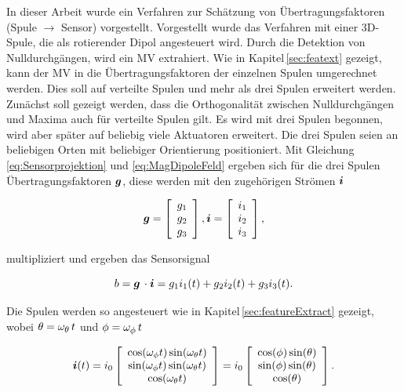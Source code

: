    In dieser Arbeit wurde ein Verfahren zur Schätzung von Übertragungsfaktoren (Spule $\rightarrow$ Sensor) vorgestellt. Vorgestellt wurde das Verfahren mit einer 3D-Spule, die als rotierender Dipol angesteuert wird. Durch die Detektion von Nulldurchgängen, wird ein MV extrahiert. Wie in Kapitel\,\ref{sec:featext} gezeigt, kann der MV in die Übertragungsfaktoren der einzelnen Spulen umgerechnet werden. Dies soll auf verteilte Spulen und mehr als drei Spulen erweitert werden.\\
   Zunächst soll gezeigt werden, dass die Orthogonalität zwischen Nulldurchgängen und Maxima auch für verteilte Spulen gilt. Es wird mit drei Spulen begonnen, wird aber später auf beliebig viele Aktuatoren erweitert. Die drei Spulen seien an beliebigen Orten mit beliebiger Orientierung positioniert. Mit Gleichung\,\ref{eq:Sensorprojektion} und \ref{eq:MagDipoleFeld} ergeben sich für die drei Spulen Übertragungsfaktoren $\mbox{\boldmath ${g}$}$, diese werden mit den zugehörigen Strömen $\mbox{\boldmath ${i}$}$ 
   
   
   \begin{equation}
      \mbox{\boldmath ${g}$} = \left[\begin{array}{c} g_1\\ g_2\\ g_3 \end{array}\right],\mbox{\boldmath ${i}$} = \left[\begin{array}{c} i_1\\ i_2\\ i_3 \end{array}\right],
      \label{eq:VekG}
   \end{equation}
   
   multipliziert und ergeben das Sensorsignal

   \begin{equation}
      b = \mbox{\boldmath ${g}$}\,\cdot\mbox{\boldmath ${i}$} = g_{1}  i_{1}(t) + g_{2}  i_{2}(t) + g_{3}  i_{3}(t).
      \label{eq:SensorSigDependent}
   \end{equation}

   Die Spulen werden so angesteuert wie in Kapitel\,\ref{sec:featureExtract} gezeigt, wobei $\theta = \omega_{\textrm{\footnotesize{$\theta$}}}\,t$ und $\phi = \omega_{\textrm{\footnotesize{$\phi$}}}\,t$

   \begin{equation}
      \mbox{\boldmath ${i}$}(t) = i_0 \left[\begin{array}{c} \cos(\omega_\phi t) \sin(\omega_\theta t)\\ \sin(\omega_\phi t)\sin(\omega_\theta t)\\ \cos(\omega_\theta t) \end{array}\right] = i_0 \left[\begin{array}{c} \cos(\phi) \sin(\theta)\\ \sin(\phi)\sin(\theta )\\ \cos(\theta ) \end{array}\right].
      \label{eq:CoilCurrents}
   \end{equation}
   
